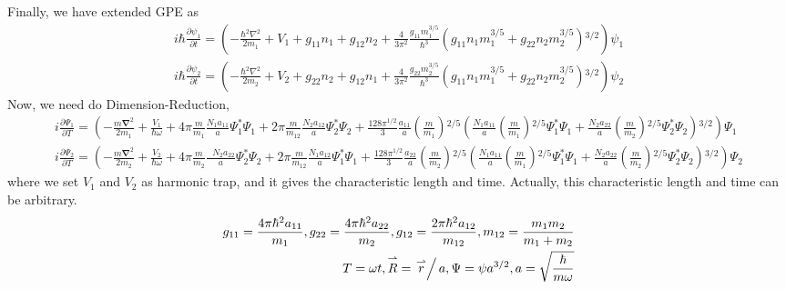 Finally, we have extended GPE as
\begin{equation}
\begin{split}
i \hbar \frac{\partial \psi _1}{\partial t}=\left(-\frac{\hbar ^2\nabla ^2}{2m_1}+V_1+g_{11}n_1+g_{12}n_2+\frac{4}{3\pi ^2}\frac{g_{11}m_1^{3/5}}{\hbar
^3}\left(g_{11}n_1m_1^{3/5}+g_{22}n_2m_2^{3/5}\right){}^{3/2}\right)\psi _1\\
i \hbar \frac{\partial \psi _2}{\partial t}=\left(-\frac{\hbar ^2\nabla ^2}{2m_2}+V_2+g_{22}n_2+g_{12}n_1+\frac{4}{3\pi ^2}\frac{g_{22}m_2^{3/5}}{\hbar
^3}\left(g_{11}n_1m_1^{3/5}+g_{22}n_2m_2^{3/5}\right){}^{3/2}\right)\psi _2
\end{split}
\end{equation}
Now, we need do Dimension-Reduction, 
\begin{equation}
\begin{split}
i \frac{\partial \Psi _1}{\partial T}=\left(-\frac{m\pmb{\nabla }^2}{2m_1}+\frac{V_1}{\hbar  \omega }+4\pi  \frac{m}{m_1}\frac{ N_1a_{11}}{a}\Psi_1^*\Psi _1+2\pi \frac{ m }{m_{12}}\frac{N_2a_{12}}{a}\Psi _2^*\Psi _2+\frac{128\pi ^{1/2} }{3} \frac{a_{11}}{a}\left(\frac{m}{m_1}\right){}^{2/5}\left(\frac{N_1a_{11}}{a}\left(\frac{m}{m_1}\right){}^{2/5}\Psi _1^*\Psi _1+ \frac{N_2a_{22}}{a}\left(\frac{m}{m_2}\right){}^{2/5}\Psi _2^*\Psi _2\right){}^{3/2}\right)\Psi_1\\
i \frac{\partial \Psi _2}{\partial T}=\left(-\frac{m\pmb{\nabla }^2}{2m_2}+\frac{V_2}{\hbar  \omega }+4\pi  \frac{m}{m_2}\frac{\text{  }N_2a_{22}}{a}\Psi_2^*\Psi _2+2\pi \frac{ m }{m_{12}}\frac{N_1a_{12}}{a}\Psi _1^*\Psi _1+\frac{128\pi ^{1/2} }{3}\frac{a_{22}}{a}\left(\frac{m}{m_2}\right){}^{2/5}\left(\frac{N_1a_{11}}{a}\left(\frac{m}{m_1}\right){}^{2/5}\Psi _1^*\Psi _1+ \frac{N_2a_{22}}{a}\left(\frac{m}{m_2}\right){}^{2/5}\Psi _2^*\Psi _2\right){}^{3/2}\right)\Psi_2
\end{split}
\end{equation}
where we set $V_1$ and $V_2$ as harmonic trap, and it gives the characteristic length and time. Actually, this characteristic length and time can be arbitrary.
\begin{equation}
\begin{split}
g_{11}=\frac{4\pi  \hbar ^2a_{11}}{m_1}, g_{22}=\frac{4\pi  \hbar ^2a_{22}}{m_2}, g_{12}=\frac{2\pi  \hbar ^2a_{12}}{m_{12}}, m_{12}=\frac{m_1m_2}{m_1+m_2}\\
T=\omega  t, \overset{\rightharpoonup }{R}=\left.\overset{\rightharpoonup }{r}\right/a, \Psi =\psi  a^{3/2}, a=\sqrt{\frac{\hbar }{m \omega }}
\end{split}
\end{equation}
